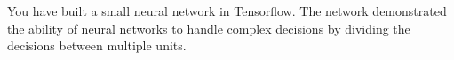 \documentclass[11pt]{article}
\makeatletter
\newcommand{\boxspacing}{\kern\kvtcb@left@rule\kern\kvtcb@boxsep}
\newcommand{\prompt}[4]{
        \ttfamily\llap{{\color{#2}[#3]:\hspace{3pt}#4}}\vspace{-\baselineskip}
    }
\makeatother
\begin{document}
You have built a small neural network in Tensorflow. The network
demonstrated the ability of neural networks to handle complex decisions
by dividing the decisions between multiple units.

    \begin{tcolorbox}[breakable, size=fbox, boxrule=1pt, pad at break*=1mm,colback=cellbackground, colframe=cellborder]
\prompt{In}{incolor}{ }{\boxspacing}
\begin{Verbatim}[commandchars=\\\{\}]

\end{Verbatim}
\end{tcolorbox}


    
    
    
\end{document}
